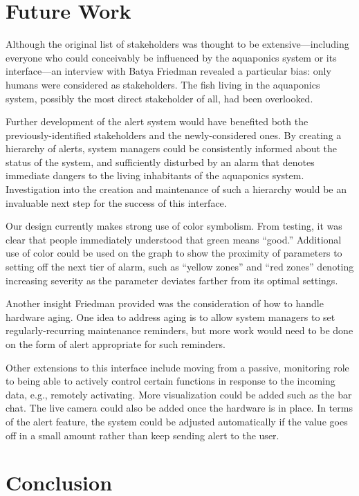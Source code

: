 \documentclass{sigchi}
\begin{document}
\section{Future Work}
Although the original list of stakeholders was thought to be extensive---including everyone who could conceivably be influenced by the aquaponics system or its interface---an interview with Batya Friedman revealed a particular bias: only humans were considered as stakeholders. The fish living in the aquaponics system, possibly the most direct stakeholder of all, had been overlooked. 

Further development of the alert system would have benefited both the previously-identified stakeholders and the newly-considered ones. By creating a hierarchy of alerts, system managers could be consistently informed about the status of the system, and sufficiently disturbed by an alarm that denotes immediate dangers to the living inhabitants of the aquaponics system. Investigation into the creation and maintenance of such a hierarchy would be an invaluable next step for the success of this interface. 

Our design currently makes strong use of color symbolism. From testing, it was clear that people immediately understood that green means ``good.'' Additional use of color could be used on the graph to show the proximity of parameters to setting off the next tier of alarm, such as ``yellow zones'' and ``red zones'' denoting increasing severity as the parameter deviates farther from its optimal settings.

Another insight Friedman provided was the consideration of how to handle hardware aging. One idea to address aging is to allow system managers to set regularly-recurring maintenance reminders, but more work would need to be done on the form of alert appropriate for such reminders.  

Other extensions to this interface include moving from a passive, monitoring role to being able to actively control certain functions in response to the incoming data, e.g., remotely activating. More visualization could be added such as the bar chat. The live camera could also be added once the hardware is in place. In terms of the alert feature, the system could be adjusted automatically if the value goes off in a small amount rather than keep sending alert to the user.

\section{Conclusion}
\end{document}
